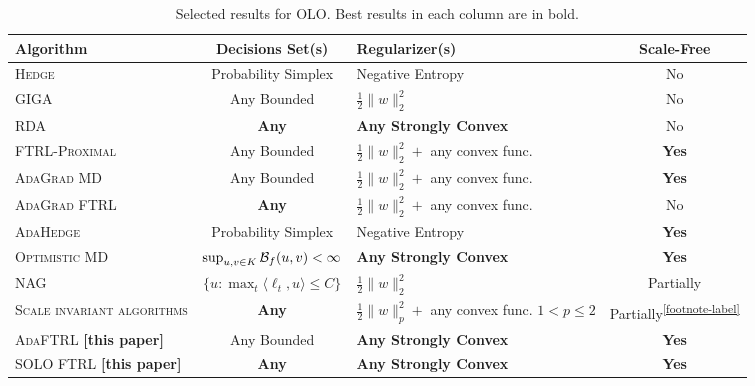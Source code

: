 \renewcommand{\arraystretch}{1.5}

\begin{table}[t]
\fontsize{8}{8.2}\selectfont
\centering
\begin{tabular}{|p{3.6cm}|c|p{3.4cm}|c|}
\hline
\textbf{Algorithm} & \textbf{Decisions Set(s)} & \textbf{Regularizer(s)} & \textbf{Scale-Free} \\ \hline \hline
\textsc{Hedge} \cite{Freund-Schapire-1999} & Probability Simplex & Negative Entropy & No \\ \hline
\textsc{GIGA} \cite{Zinkevich-2003} & Any Bounded & $\frac{1}{2}\|w\|_2^2$ & No \\ \hline
\textsc{RDA} \cite{Xiao-2010} & \textbf{Any} & \textbf{Any Strongly Convex} & No \\ \hline
\textsc{FTRL-Proximal} \cite{McMahan-Streeter-2010,McMahan-2014} & Any Bounded & $\frac{1}{2}\|w\|_2^2 + $ any convex func. & \textbf{Yes} \\ \hline
\textsc{AdaGrad MD} \cite{Duchi-Hazan-Singer-2011} & Any Bounded & $\frac{1}{2}\|w\|_2^2 + $ any convex func. & \textbf{Yes} \\ \hline
\textsc{AdaGrad FTRL} \cite{Duchi-Hazan-Singer-2011} & \textbf{Any} & $\frac{1}{2}\|w\|_2^2 + $ any convex func. & No \\ \hline
\textsc{AdaHedge} \cite{de-Rooij-van-Erven-Grunwald-Koolen-2014} & Probability Simplex & Negative Entropy & \textbf{Yes} \\ \hline
\textsc{Optimistic MD} \cite{Rakhlin-Sridharan-2013} & $\sup_{u,v \in K} \mathcal{B}_f(u,v) < \infty$ & \textbf{Any Strongly Convex} & \textbf{Yes} \\ \hline
\textsc{NAG} \cite{Ross-Mineiro-Langford-2013} & $\{u: \max_t \langle \ell_t, u\rangle \leq C\}$ & $\frac{1}{2}\|w\|_2^2 $& Partially\footnotemark \\ \hline
\textsc{Scale invariant algorithms} \cite{Orabona-Crammer-Cesa-Bianchi-2014} & \textbf{Any} & $\frac{1}{2}\|w\|_p^2 + $ any convex func. \newline $1<p\leq2$ & Partially\textsuperscript{\ref{footnote-label}} \\ \hline
\textsc{AdaFTRL} \textbf{[this paper]} & Any Bounded & \textbf{Any Strongly Convex} & \textbf{Yes} \\ \hline
\textsc{SOLO FTRL} \textbf{[this paper]} & \textbf{Any} & \textbf{Any Strongly Convex} & \textbf{Yes} \\ \hline
\end{tabular}
\caption{Selected results for OLO. Best results in each column are in bold.
\label{table:results}
}
\end{table}

